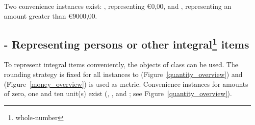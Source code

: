 Two convenience instances exist: , representing \euro{0,00}, and , representing an amount greater than \euro{9000,00}.

\subsection[]{ - Representing persons or other integral\protect\footnote{whole-number} items}
To represent integral items conveniently, the objects of class  can be used.
The rounding strategy is fixed for all instances to  (Figure~\ref{quantity_overview}) and  (Figure~\ref{money_overview}) is used as metric.
Convenience instances for amounts of zero, one and ten unit(s) exist (, , and ; see Figure~\ref{quantity_overview}).
